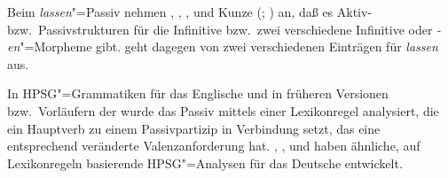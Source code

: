 {{%

Beim \emph{lassen}"=Passiv nehmen \citet[]{Reis76c}, \citet{Wilder90a},
\citet[--149]{Fanselow87a}, %
\citet[]{Demske94a} und 
Kunze (\citeyear[]{Kunze96}; \citeyear[]{Kunze97a}) %
an, daß es Aktiv- bzw.\ Passivstrukturen für die Infinitive
bzw.\ zwei verschiedene Infinitive oder \emph{-en}"=Morpheme gibt.
\citet[]{Hoehle78a} geht dagegen von zwei verschiedenen Einträgen für \emph{lassen} aus.

In HPSG"=Grammatiken für das Englische \citep[--218]{ps}
und in früheren Versionen bzw.\ Vorläufern der \lfg \citep{Bresnan78a,Bresnan82a} wurde das Passiv mittels einer Lexikonregel
analysiert, die ein Hauptverb zu einem Passivpartizip in Verbindung setzt, das eine entsprechend
veränderte Valenzanforderung hat.
\citet[]{Kiss92}, 
\citet{HN98a},
\citet[]{Kathol98b} und
\citet{Mueller2000h}
haben ähnliche, auf Lexikonregeln basierende HPSG"=Analysen für das Deutsche entwickelt.
}



\begin{comment}

liefen die Jungen von unserer Straße auf tiefer gelegenen Tümpeln in den Feldern Schlittschuh, 
wenn diese vollgeregnet waren\footnote{
  taz, 19.03.1999, LeserInnenbriefe, S.\,7.
}

Aus einem ihrer Fenster im dritten Stock haben die Mitglieder des Neuen Forums,
der Vereinigten Linken, der Umweltbibliothek und die "`mündigen Bürger"' ein Transparent herausgehängt.
Vollgeregnet fordert es die "`Zerschlagung der Stasi-Struktur -- Gegen neue Geheimdienste -- 
Keinen Polizeistaat"'.\footnote{
  taz, 12.09.1990, S.\,5.
}
Seine Landschaften sind weder klare Sehnsuchts-bilder romantischer Ferne noch kultivierte er die sentimentalen Ecken des Spaziergängers. Seine Natur ist windzerzaust, naßgeregnet, aufgewühlt.
12.4.1991 Lavie 96 Zeilen, katrin bettina müller S. 4

die armen Radfahrer, strampeln ohne jede Motorkraft ungeschützt gegen Wind und Wetter, naßgeschwitzt und naßgeregnet.
21.10.1988 taz 337 Zeilen, bernd müllender S. 11

Sie werden erst eingeschneit, dann langsam eingeregnet, 
21.2.1992 taz 248 Zeilen, elke schmitter S. 16
In taz-Berlin S.18 / Europaverlag


\end{comment}}
